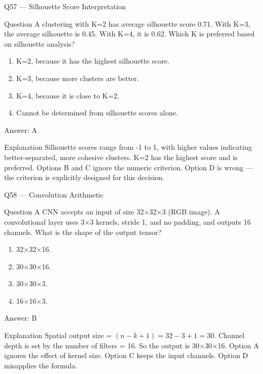 \documentclass[aspectratio=169,8pt]{beamer}
\begin{document}
	\begin{frame}{Q57 --- Silhouette Score Interpretation}
		\begin{block}{Question}
			A clustering with K=2 has average silhouette score 0.71. With K=3, the average silhouette is 0.45. With K=4, it is 0.62. Which K is preferred based on silhouette analysis?
		\end{block}
		\begin{enumerate}
			\item K=2, because it has the highest silhouette score.
			\item K=3, because more clusters are better.
			\item K=4, because it is close to K=2.
			\item Cannot be determined from silhouette scores alone.
		\end{enumerate}
		\begin{exampleblock}{Answer: A}\end{exampleblock}
		\begin{block}{Explanation}
			Silhouette scores range from -1 to 1, with higher values indicating better-separated, more cohesive clusters. K=2 has the highest score and is preferred. Options B and C ignore the numeric criterion. Option D is wrong --- the criterion is explicitly designed for this decision.
		\end{block}
	\end{frame}
	
	\begin{frame}{Q58 --- Convolution Arithmetic}
		\begin{block}{Question}
			A CNN accepts an input of size 32$\times$32$\times$3 (RGB image). A convolutional layer uses 3$\times$3 kernels, stride 1, and no padding, and outputs 16 channels. What is the shape of the output tensor?
		\end{block}
		\begin{enumerate}
			\item 32$\times$32$\times$16.
			\item 30$\times$30$\times$16.
			\item 30$\times$30$\times$3.
			\item 16$\times$16$\times$3.
		\end{enumerate}
		\begin{exampleblock}{Answer: B}\end{exampleblock}
		\begin{block}{Explanation}
			Spatial output size = $(n - k + 1) = 32 - 3 + 1 = 30$. Channel depth is set by the number of filters = 16. So the output is 30$\times$30$\times$16. Option A ignores the effect of kernel size. Option C keeps the input channels. Option D misapplies the formula.
		\end{block}
	\end{frame}
	
\end{document}
